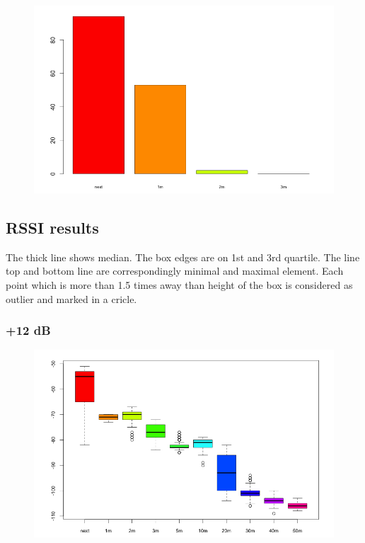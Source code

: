 \begin{figure}[H]
  \centering
  \includegraphics[width=1.0\textwidth]{img/tests/range/db_m30.png}
\end{figure}

\subsection{RSSI results}

The thick line shows median. The box edges are on 1st and 3rd quartile. The line top and bottom line are correspondingly minimal and maximal element. Each point which is more than 1.5 times away than height of the box is considered as outlier and marked in a cricle.

\subsubsection{+12 dB}

\begin{figure}[H]
  \centering
  \includegraphics[width=1.0\textwidth]{img/tests/rssi/db_12.png}
\end{figure}


